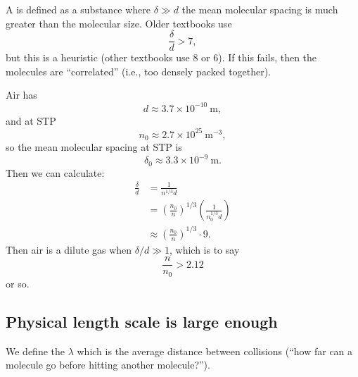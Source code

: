 \begin{definition}
A  is defined as a substance where $\delta\gg d$
the mean molecular spacing is much greater than the molecular size.
Older textbooks use
\begin{equation}
\frac{\delta}{d}>7,
\end{equation}
but this is a heuristic (other textbooks use 8 or 6). If this fails,
then the molecules are ``correlated'' (i.e., too densely packed together).
\end{definition}

\begin{example}
  Air has
  \begin{equation}
d\approx3.7\times10^{-10}~\mathrm{m},
  \end{equation}
  and at STP
\begin{equation}
n_{0}\approx2.7\times10^{25}~\mathrm{m}^{-3},
\end{equation}
so the mean molecular spacing at STP is
\begin{equation}
\delta_{0}\approx3.3\times10^{-9}~\mathrm{m}.
\end{equation}
Then we can calculate:
\begin{subequations}
  \begin{align}
\frac{\delta}{d}
&=\frac{1}{n^{1/3}d}\\
&=\left(\frac{n_{0}}{n}\right)^{1/3}\left(\frac{1}{n_{0}^{1/3}d}\right)\\
&\approx\left(\frac{n_{0}}{n}\right)^{1/3}\cdot9.
  \end{align}
\end{subequations}
Then air is a dilute gas when $\delta/d\gg1$, which is to say
\begin{equation}
\frac{n}{n_{0}}>2.12
\end{equation}
or so.
\end{example}

\subsection*{Physical length scale is large enough}

\begin{definition}
We define the  $\lambda$ which is the average
distance between collisions (``how far can a molecule go before
hitting another molecule?'').
\end{definition}

